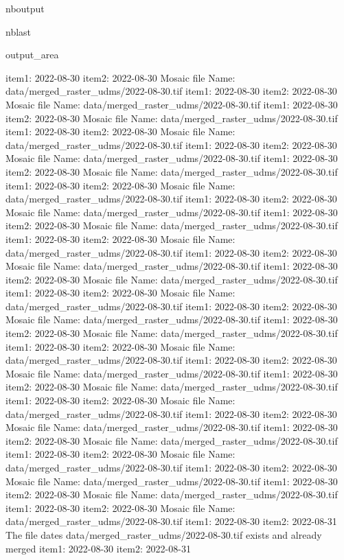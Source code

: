 \documentclass[letterpaper,10pt]{sphinxmanual}
\begin{document}
\begin{sphinxuseclass}{nboutput}
\begin{sphinxuseclass}{nblast}
{\begin{sphinxuseclass}{output_area}
\begin{sphinxuseclass}{}
\begin{sphinxVerbatim}[commandchars=\\\{\}]
item1:  2022-08-30
item2:  2022-08-30
Mosaic file Name:  data/merged\_raster\_udms/2022-08-30.tif
item1:  2022-08-30
item2:  2022-08-30
Mosaic file Name:  data/merged\_raster\_udms/2022-08-30.tif
item1:  2022-08-30
item2:  2022-08-30
Mosaic file Name:  data/merged\_raster\_udms/2022-08-30.tif
item1:  2022-08-30
item2:  2022-08-30
Mosaic file Name:  data/merged\_raster\_udms/2022-08-30.tif
item1:  2022-08-30
item2:  2022-08-30
Mosaic file Name:  data/merged\_raster\_udms/2022-08-30.tif
item1:  2022-08-30
item2:  2022-08-30
Mosaic file Name:  data/merged\_raster\_udms/2022-08-30.tif
item1:  2022-08-30
item2:  2022-08-30
Mosaic file Name:  data/merged\_raster\_udms/2022-08-30.tif
item1:  2022-08-30
item2:  2022-08-30
Mosaic file Name:  data/merged\_raster\_udms/2022-08-30.tif
item1:  2022-08-30
item2:  2022-08-30
Mosaic file Name:  data/merged\_raster\_udms/2022-08-30.tif
item1:  2022-08-30
item2:  2022-08-30
Mosaic file Name:  data/merged\_raster\_udms/2022-08-30.tif
item1:  2022-08-30
item2:  2022-08-30
Mosaic file Name:  data/merged\_raster\_udms/2022-08-30.tif
item1:  2022-08-30
item2:  2022-08-30
Mosaic file Name:  data/merged\_raster\_udms/2022-08-30.tif
item1:  2022-08-30
item2:  2022-08-30
Mosaic file Name:  data/merged\_raster\_udms/2022-08-30.tif
item1:  2022-08-30
item2:  2022-08-30
Mosaic file Name:  data/merged\_raster\_udms/2022-08-30.tif
item1:  2022-08-30
item2:  2022-08-30
Mosaic file Name:  data/merged\_raster\_udms/2022-08-30.tif
item1:  2022-08-30
item2:  2022-08-30
Mosaic file Name:  data/merged\_raster\_udms/2022-08-30.tif
item1:  2022-08-30
item2:  2022-08-30
Mosaic file Name:  data/merged\_raster\_udms/2022-08-30.tif
item1:  2022-08-30
item2:  2022-08-30
Mosaic file Name:  data/merged\_raster\_udms/2022-08-30.tif
item1:  2022-08-30
item2:  2022-08-30
Mosaic file Name:  data/merged\_raster\_udms/2022-08-30.tif
item1:  2022-08-30
item2:  2022-08-30
Mosaic file Name:  data/merged\_raster\_udms/2022-08-30.tif
item1:  2022-08-30
item2:  2022-08-30
Mosaic file Name:  data/merged\_raster\_udms/2022-08-30.tif
item1:  2022-08-30
item2:  2022-08-30
Mosaic file Name:  data/merged\_raster\_udms/2022-08-30.tif
item1:  2022-08-30
item2:  2022-08-30
Mosaic file Name:  data/merged\_raster\_udms/2022-08-30.tif
item1:  2022-08-30
item2:  2022-08-30
Mosaic file Name:  data/merged\_raster\_udms/2022-08-30.tif
item1:  2022-08-30
item2:  2022-08-30
Mosaic file Name:  data/merged\_raster\_udms/2022-08-30.tif
item1:  2022-08-30
item2:  2022-08-31
The file dates data/merged\_raster\_udms/2022-08-30.tif exists and already merged
item1:  2022-08-30
item2:  2022-08-31

\end{sphinxVerbatim}
\end{sphinxuseclass}
\end{sphinxuseclass}}
\end{sphinxuseclass}
\end{sphinxuseclass}
\end{document}
